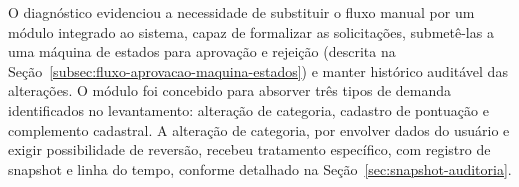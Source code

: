 O diagnóstico evidenciou a necessidade de substituir o fluxo manual por um módulo integrado ao sistema, capaz de 
formalizar as solicitações, submetê-las a uma máquina de estados para aprovação e rejeição (descrita na Seção~\ref{subsec:fluxo-aprovacao-maquina-estados}) 
e manter histórico auditável das alterações. O módulo foi concebido para absorver três tipos de demanda identificados no levantamento: alteração 
de categoria, cadastro de pontuação e complemento cadastral. A alteração de categoria, por envolver dados do usuário e exigir possibilidade de 
reversão, recebeu tratamento específico, com registro de snapshot e linha do tempo, conforme detalhado na Seção~\ref{sec:snapshot-auditoria}.